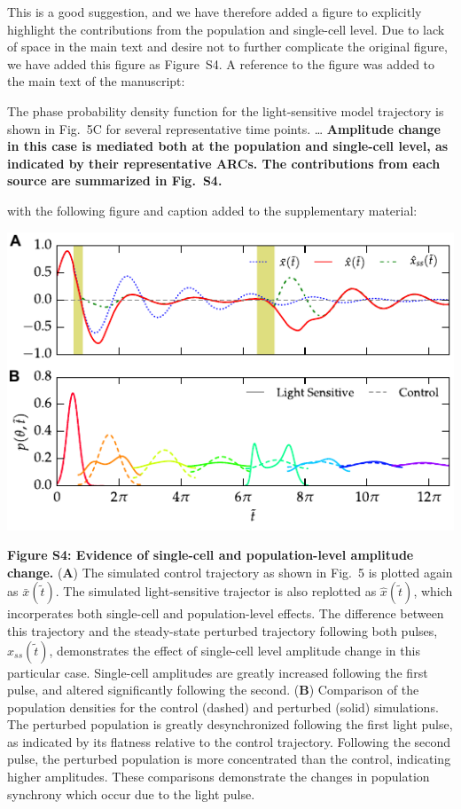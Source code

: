 \documentclass[11pt, letterpaper]{article}
\newenvironment{manuscript}[1]{\begin{center}\begin{tcolorbox}[colback=green!5!white,colframe=green!75!black,width=0.8\textwidth,title={#1},breakable,fonttitle=\bfseries]}{\end{tcolorbox}\end{center}}
\begin{document}
This is a good suggestion, and we have therefore added a figure to explicitly highlight the contributions from the population and single-cell level.
Due to lack of space in the main text and desire not to further complicate the original figure, we have added this figure as Figure~S4. A reference to the figure was added to the main text of the manuscript:

\begin{manuscript}{Page 16}
The phase probability density function for the light-sensitive model trajectory is shown in Fig.~5C for several representative time points.
\ldots
{\bfseries Amplitude change in this case is mediated both at the population and single-cell level, as indicated by their representative ARCs. The contributions from each source are summarized in Fig.~S4.}
\end{manuscript}

with the following figure and caption added to the supplementary material:

\begin{manuscript}{Supplemental Info, Page 7}
  \begin{center}
    \includegraphics[width=.85\textwidth]{figures/figure_S4.pdf}\\
  \end{center}
{\bfseries Figure S4: Evidence of single-cell and population-level amplitude change.}
({\bfseries A}) The simulated control trajectory as shown in Fig.~5 is plotted again as $\bar{x}(\tilde{t})$.
The simulated light-sensitive trajector is also replotted as $\hat{x}(\tilde{t})$, which incorperates both single-cell and population-level effects.
The difference between this trajectory and the steady-state perturbed trajectory following both pulses, $\hat{x}_{ss}(\tilde{t})$, demonstrates the effect of single-cell level amplitude change in this particular case. 
Single-cell amplitudes are greatly increased following the first pulse, and altered significantly following the second.
({\bfseries B})
Comparison of the population densities for the control (dashed) and perturbed (solid) simulations.
The perturbed population is greatly desynchronized following the first light pulse, as indicated by its flatness relative to the control trajectory. 
Following the second pulse, the perturbed population is more concentrated than the control, indicating higher amplitudes. 
These comparisons demonstrate the changes in population synchrony which occur due to the light pulse. 
\end{manuscript}
\end{document}
